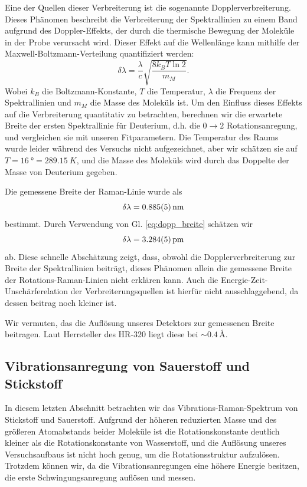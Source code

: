 \documentclass[11pt]{article}
\begin{document}
Eine der Quellen dieser Verbreiterung ist die sogenannte Dopplerverbreiterung. Dieses Phänomen beschreibt die Verbreiterung der Spektrallinien zu einem Band aufgrund des Doppler-Effekts, der durch die thermische Bewegung der Moleküle in der Probe verursacht wird. Dieser Effekt auf die Wellenlänge kann mithilfe der Maxwell-Boltzmann-Verteilung quantifiziert werden:
\begin{equation}
\label{eq:dopp_breite}
\delta \lambda = \dfrac{\lambda}{c} \sqrt{\dfrac{8k_B T \ln 2}{m_{M}}}. 
\end{equation}
Wobei $k_B$ die Boltzmann-Konstante, $T$ die Temperatur, $\lambda$ die Frequenz der Spektrallinien und $m_{M}$ die Masse des Moleküls ist. Um den Einfluss dieses Effekts auf die Verbreiterung quantitativ zu betrachten, berechnen wir die erwartete Breite der ersten Spektrallinie für Deuterium, d.h. die $0\to 2$ Rotationsanregung, und vergleichen sie mit unseren Fitparametern. Die Temperatur des Raums wurde leider während des Versuchs nicht aufgezeichnet, aber wir schätzen sie auf $T = \SI{16}{\degree} = \SI{289.15}{K}$, und die Masse des Moleküls wird durch das Doppelte der Masse von Deuterium gegeben.

Die gemessene Breite der Raman-Linie wurde als
$$\delta \lambda = \SI{0.885 \pm 0.005}{\nano\meter}$$
bestimmt. Durch Verwendung von Gl. \ref{eq:dopp_breite} schätzen wir
$$\delta \lambda =  \SI{3.284\pm 0.005}{\pico\meter}$$
ab. Diese schnelle Abschätzung zeigt, dass, obwohl die Dopplerverbreiterung zur Breite der Spektrallinien beiträgt, dieses Phänomen allein die gemessene Breite der Rotations-Raman-Linien nicht erklären kann. Auch die Energie-Zeit-Unschärferelation der Verbreiterungsquellen ist hierfür nicht ausschlaggebend, da dessen beitrag noch kleiner ist. 

Wir vermuten, das die Auflösung unseres Detektors zur gemessenen Breite beitragen. Laut Herrsteller des  HR-320 liegt diese bei  $\sim 0.4\,$\AA.

\subsection{Vibrationsanregung von Sauerstoff und Stickstoff}
In diesem letzten Abschnitt betrachten wir das Vibrations-Raman-Spektrum von Stickstoff und Sauerstoff. Aufgrund der höheren reduzierten Masse und des größeren Atomabstands beider Moleküle ist die Rotationskonstante deutlich kleiner als die Rotationskonstante von Wasserstoff, und die Auflösung unseres Versuchsaufbaus ist nicht hoch genug, um die Rotationsstruktur aufzulösen. Trotzdem können wir, da die Vibrationsanregungen eine höhere Energie besitzen, die erste Schwingungsanregung auflösen und messen.
\end{document}
